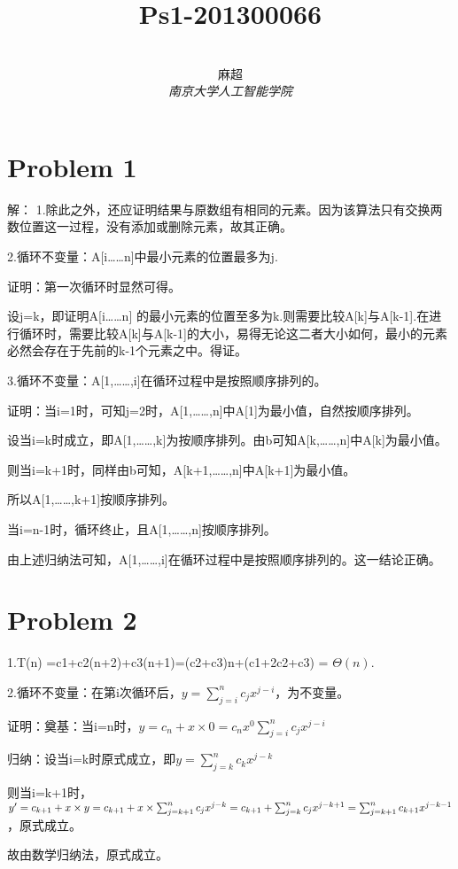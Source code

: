 \documentclass[12pt,a4paper]{article}
\title{\textbf{Ps1-201300066}}%
\author{
\\
\Large{麻超 \quad 201300066}
\\[6pt]
{ \large \textit{南京大学人工智能学院}}\\[2pt]
}
\date{}
\begin{document}
\maketitle
\setcounter{page}{1}

\section{Problem 1}
解：
1.除此之外，还应证明结果与原数组有相同的元素。因为该算法只有交换两数位置这一过程，没有添加或删除元素，故其正确。

2.循环不变量：A[i……n]中最小元素的位置最多为j.\par
证明：第一次循环时显然可得。\par
设j=k，即证明A[i……n] 的最小元素的位置至多为k.则需要比较A[k]与A[k-1].在进行循环时，需要比较A[k]与A[k-1]的大小，易得无论这二者大小如何，最小的元素必然会存在于先前的k-1个元素之中。得证。

3.循环不变量：A[1,……,i]在循环过程中是按照顺序排列的。\par
证明：当i=1时，可知j=2时，A[1,……,n]中A[1]为最小值，自然按顺序排列。\par
设当i=k时成立，即A[1,……,k]为按顺序排列。由b可知A[k,……,n]中A[k]为最小值。\par
则当i=k+1时，同样由b可知，A[k+1,……,n]中A[k+1]为最小值。\par
所以A[1,……,k+1]按顺序排列。\par
当i=n-1时，循环终止，且A[1,……,n]按顺序排列。\par
由上述归纳法可知，A[1,……,i]在循环过程中是按照顺序排列的。这一结论正确。
\section{Problem 2}
1.T(n) =c1+c2(n+2)+c3(n+1)=(c2+c3)n+(c1+2c2+c3) = $\Theta (n)$.

2.循环不变量：在第i次循环后，$y=\sum_{j=i}^n c_jx^{j-i}$，为不变量。

证明：奠基：当i=n时，$y=c_n+x\times 0=c_nx^0\sum_{j=i}^n c_jx^{j-i} $

归纳：设当i=k时原式成立，即$y=\sum_{j=k}^n c_kx^{j-k}$

则当i=k+1时，$y'=c_{k+1}+x\times y=c_{k+1}+x\times \sum_{j=k+1}^n c_jx^{j-k}=\\
	c_{k+1}+\sum_{j=k}^n c_jx^{j-k+1}=\sum_{j=k+1}^n c_{k+1}x^{j-k-1}$，原式成立。

故由数学归纳法，原式成立。
\end{document}
